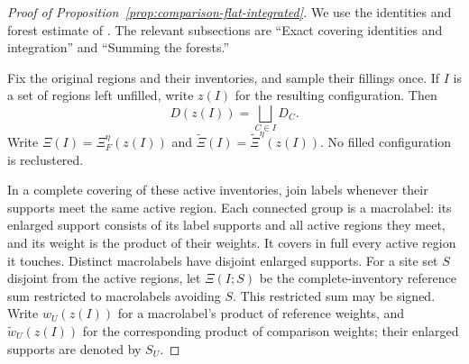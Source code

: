 \begin{proof}[Proof of Proposition~\ref{prop:comparison-flat-integrated}]
We use the identities and forest estimate of
\cite[Sections~7.4--7.5]{O3Continuum}.  The relevant subsections are
``Exact covering identities and integration'' and ``Summing the forests.''

Fix the original regions and their inventories, and sample their fillings
once.  If \(I\) is a set of regions left unfilled, write \(z(I)\) for the
resulting configuration.  Then
\[
 D(z(I))=\bigsqcup_{C\in I}D_C.
\]
Write \(\Xi(I)=\Xi_F^\eta(z(I))\) and
\(\widetilde\Xi(I)=\widetilde\Xi^\eta(z(I))\).
No filled configuration is reclustered.

In a complete covering of these active inventories, join labels whenever
their supports meet the same active region.  Each connected group is a
macrolabel: its enlarged support consists of its label supports and all
active regions they meet, and its weight is the product of their weights.
It covers in full every active region it touches.  Distinct macrolabels
have disjoint enlarged supports.  For a site set \(S\) disjoint from the
active regions, let \(\Xi(I;S)\) be the complete-inventory reference sum
restricted to macrolabels avoiding \(S\).  This restricted sum may be signed.
Write \(w_U(z(I))\) for a macrolabel's product of reference weights, and
\(\widetilde w_U(z(I))\) for the corresponding product of comparison
weights; their enlarged supports are denoted by \(S_U\).


\end{proof}
